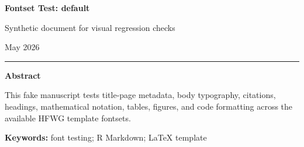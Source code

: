 \documentclass[12pt]{article}
\newif\ifhfwganon
\begin{document}
\begin{titlepage}
\thispagestyle{empty}
\vspace*{0.12\textheight}
\begin{center}
\begin{singlespace}

{\LARGE\bfseries Fontset Test: default\par}

\vspace{0.35em}
{\large Synthetic document for visual regression checks\par}

\vspace{2.2em}

\hfwgauthorblock

\par\vspace{1.5\baselineskip}
\hfwgseriesblock

\ifhfwganon\else
\vspace{0.35em}
{\small May 2026}\par
\fi

\vspace{2.2\baselineskip}
\noindent\rule{0.35\textwidth}{0.4pt}\par
\vspace{0.65em}
\begin{minipage}{0.78\textwidth}
\small\singlespacing
\textbf{Abstract}\par\vspace{0.3em}
This fake manuscript tests title-page metadata, body typography,
citations, headings, mathematical notation, tables, figures, and code
formatting across the available HFWG template fontsets.
\par\vspace{0.6em}
\textbf{Keywords:} font testing; R Markdown; LaTeX template
\end{minipage}

\end{singlespace}
\end{center}
\vfill
\end{titlepage}
\else
\end{document}
